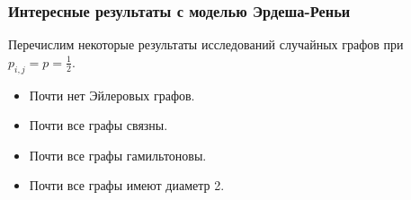 \frametitle{Интересные результаты с моделью Эрдеша-Реньи}

Перечислим некоторые результаты исследований случайных графов при $p_{i, j} = p = \frac{1}{2}$.

\begin{itemize}[<+(1)->] 
    \item Почти нет Эйлеровых графов.
    \item Почти все графы связны.
    \item Почти все графы гамильтоновы.
    \item Почти все графы имеют диаметр 2.
\end{itemize} 

